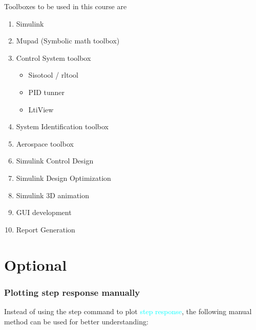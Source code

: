 \documentclass[hyperref={pdfpagelabels=true}]{beamer}
\begin{document}
\begin{frame}
Toolboxes to be used in this course are
\begin{enumerate}
\item Simulink
\item Mupad (Symbolic math toolbox)
\item Control System toolbox
\begin{itemize}
\item Sisotool / rltool
\item PID tunner
\item LtiView
\end{itemize}
\item System Identification toolbox
\item Aerospace toolbox
\item Simulink Control Design
\item Simulink Design Optimization
\item Simulink 3D animation 
\item GUI development
\item Report Generation
\end{enumerate}
\end{frame}




\section{Optional}

\begin{frame}[shrink]
\frametitle{Plotting step response manually}
Instead of using the step command to plot \textcolor{cyan}{step response},
the following manual method can be used for better understanding:
\tiny{

%
}
\label{step}
 \hyperlink{what}{}
\end{frame}
\end{document}
